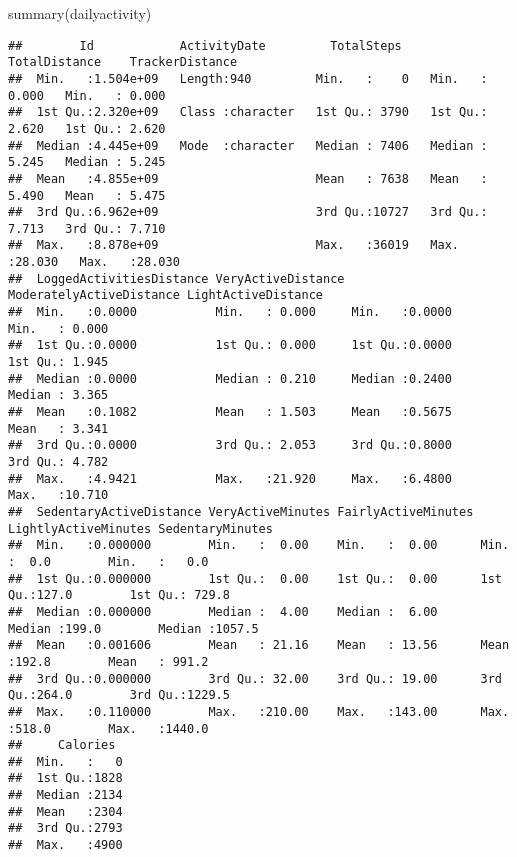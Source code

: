 \documentclass[
]{article}
\newenvironment{Shaded}{\begin{snugshade}}{\end{snugshade}}
\newcommand{\FunctionTok}[1]{\textcolor[rgb]{0.00,0.00,0.00}{#1}}
\newcommand{\NormalTok}[1]{#1}
\begin{document}
\begin{Shaded}
\begin{Highlighting}[]
\FunctionTok{summary}\NormalTok{(dailyactivity)}
\end{Highlighting}
\end{Shaded}

\begin{verbatim}
##        Id            ActivityDate         TotalSteps    TotalDistance    TrackerDistance 
##  Min.   :1.504e+09   Length:940         Min.   :    0   Min.   : 0.000   Min.   : 0.000  
##  1st Qu.:2.320e+09   Class :character   1st Qu.: 3790   1st Qu.: 2.620   1st Qu.: 2.620  
##  Median :4.445e+09   Mode  :character   Median : 7406   Median : 5.245   Median : 5.245  
##  Mean   :4.855e+09                      Mean   : 7638   Mean   : 5.490   Mean   : 5.475  
##  3rd Qu.:6.962e+09                      3rd Qu.:10727   3rd Qu.: 7.713   3rd Qu.: 7.710  
##  Max.   :8.878e+09                      Max.   :36019   Max.   :28.030   Max.   :28.030  
##  LoggedActivitiesDistance VeryActiveDistance ModeratelyActiveDistance LightActiveDistance
##  Min.   :0.0000           Min.   : 0.000     Min.   :0.0000           Min.   : 0.000     
##  1st Qu.:0.0000           1st Qu.: 0.000     1st Qu.:0.0000           1st Qu.: 1.945     
##  Median :0.0000           Median : 0.210     Median :0.2400           Median : 3.365     
##  Mean   :0.1082           Mean   : 1.503     Mean   :0.5675           Mean   : 3.341     
##  3rd Qu.:0.0000           3rd Qu.: 2.053     3rd Qu.:0.8000           3rd Qu.: 4.782     
##  Max.   :4.9421           Max.   :21.920     Max.   :6.4800           Max.   :10.710     
##  SedentaryActiveDistance VeryActiveMinutes FairlyActiveMinutes LightlyActiveMinutes SedentaryMinutes
##  Min.   :0.000000        Min.   :  0.00    Min.   :  0.00      Min.   :  0.0        Min.   :   0.0  
##  1st Qu.:0.000000        1st Qu.:  0.00    1st Qu.:  0.00      1st Qu.:127.0        1st Qu.: 729.8  
##  Median :0.000000        Median :  4.00    Median :  6.00      Median :199.0        Median :1057.5  
##  Mean   :0.001606        Mean   : 21.16    Mean   : 13.56      Mean   :192.8        Mean   : 991.2  
##  3rd Qu.:0.000000        3rd Qu.: 32.00    3rd Qu.: 19.00      3rd Qu.:264.0        3rd Qu.:1229.5  
##  Max.   :0.110000        Max.   :210.00    Max.   :143.00      Max.   :518.0        Max.   :1440.0  
##     Calories   
##  Min.   :   0  
##  1st Qu.:1828  
##  Median :2134  
##  Mean   :2304  
##  3rd Qu.:2793  
##  Max.   :4900
\end{verbatim}
\end{document}
